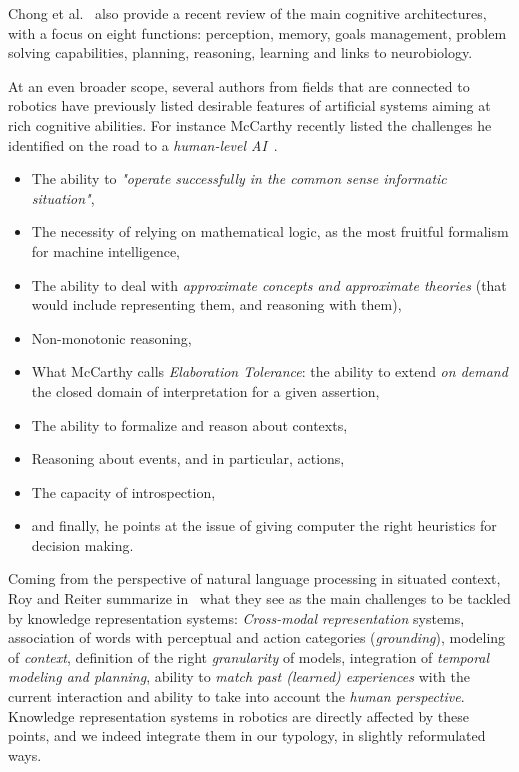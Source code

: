 \documentclass[journal]{IEEEtran}
\begin{document}
Chong et al.~\cite{Chong2009} also provide a recent review of the main cognitive
architectures, with a focus on eight functions: perception, memory, goals
management, problem solving capabilities, planning, reasoning, learning and
links to neurobiology.

At an even broader scope, several authors from fields that are connected to
robotics have previously listed desirable features of artificial systems aiming
at rich cognitive abilities. For instance McCarthy recently listed the 
challenges he identified on the road to a \emph{human-level AI}~\cite{McCarthy2007}.

\begin{itemize}

	\item The ability to \emph{"operate successfully in the common sense
	informatic situation"},

	\item The necessity of relying on mathematical logic, as the most fruitful
	formalism for machine intelligence,

	\item The ability to deal with \emph{approximate concepts and approximate
	theories} (that would include representing them, and reasoning with them),

	\item Non-monotonic reasoning,

	\item What McCarthy calls \emph{Elaboration Tolerance}: the ability to
	extend \emph{on demand} the closed domain of interpretation for a
	given assertion,

	\item The ability to formalize and reason about contexts,

	\item Reasoning about events, and in particular, actions,

	\item The capacity of introspection,

	\item and finally, he points at the issue of giving computer the right
	heuristics for decision making.

\end{itemize}

Coming from the perspective of natural language processing in situated context,
Roy and Reiter summarize in~\cite{Roy2005} what they see as the main challenges
to be tackled by knowledge representation systems: \emph{Cross-modal
representation} systems, association of words with perceptual and action
categories (\emph{grounding}), modeling of \emph{context}, definition of the
right \emph{granularity} of models, integration of \emph{temporal modeling and
planning}, ability to \emph{match past (learned) experiences} with the current
interaction and ability to take into account the \emph{human perspective}.
% 
Knowledge representation systems in robotics are directly affected by these
points, and we indeed integrate them in our typology, in slightly reformulated
ways.
\end{document}
